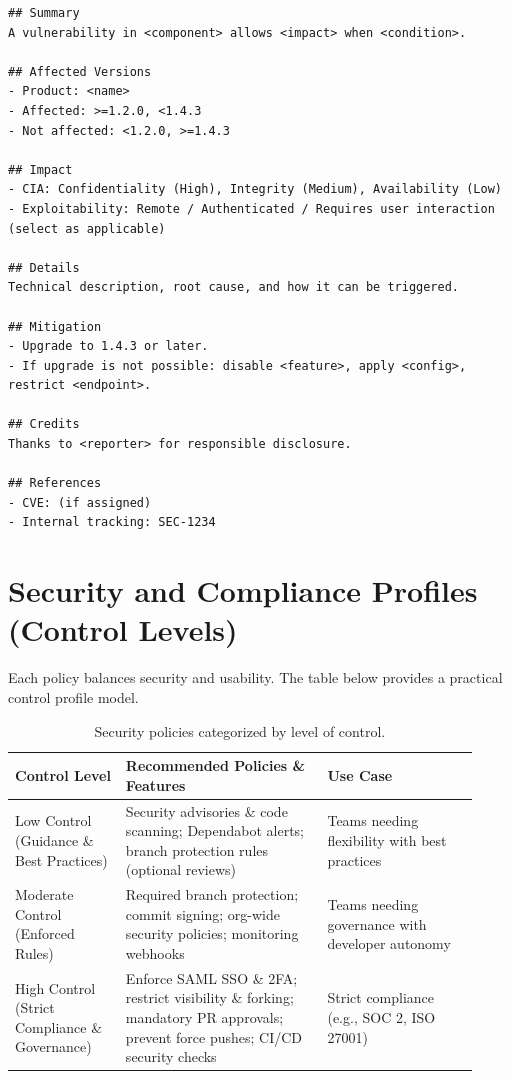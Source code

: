 \documentclass[11pt]{article}
\begin{document}
\begin{examplebox}[title={Example: Advisory template (copy/paste starter)}]
\begin{verbatim}
## Summary
A vulnerability in <component> allows <impact> when <condition>.

## Affected Versions
- Product: <name>
- Affected: >=1.2.0, <1.4.3
- Not affected: <1.2.0, >=1.4.3

## Impact
- CIA: Confidentiality (High), Integrity (Medium), Availability (Low)
- Exploitability: Remote / Authenticated / Requires user interaction (select as applicable)

## Details
Technical description, root cause, and how it can be triggered.

## Mitigation
- Upgrade to 1.4.3 or later.
- If upgrade is not possible: disable <feature>, apply <config>, restrict <endpoint>.

## Credits
Thanks to <reporter> for responsible disclosure.

## References
- CVE: (if assigned)
- Internal tracking: SEC-1234
\end{verbatim}
\end{examplebox}

\section{Security and Compliance Profiles (Control Levels)}

Each policy balances security and usability. The table below provides a practical control profile model.

\begin{table}[h!]
\centering
\begin{tabular}{@{}p{0.22\linewidth}p{0.40\linewidth}p{0.30\linewidth}@{}}
\toprule
\textbf{Control Level} & \textbf{Recommended Policies \& Features} & \textbf{Use Case} \\
\midrule
Low Control (Guidance \& Best Practices)
& Security advisories \& code scanning; Dependabot alerts; branch protection rules (optional reviews)
& Teams needing flexibility with best practices \\

Moderate Control (Enforced Rules)
& Required branch protection; commit signing; org-wide security policies; monitoring webhooks
& Teams needing governance with developer autonomy \\

High Control (Strict Compliance \& Governance)
& Enforce SAML SSO \& 2FA; restrict visibility \& forking; mandatory PR approvals; prevent force pushes; CI/CD security checks
& Strict compliance (e.g., SOC 2, ISO 27001) \\
\bottomrule
\end{tabular}
\caption{Security policies categorized by level of control.}
\end{table}
\end{document}
